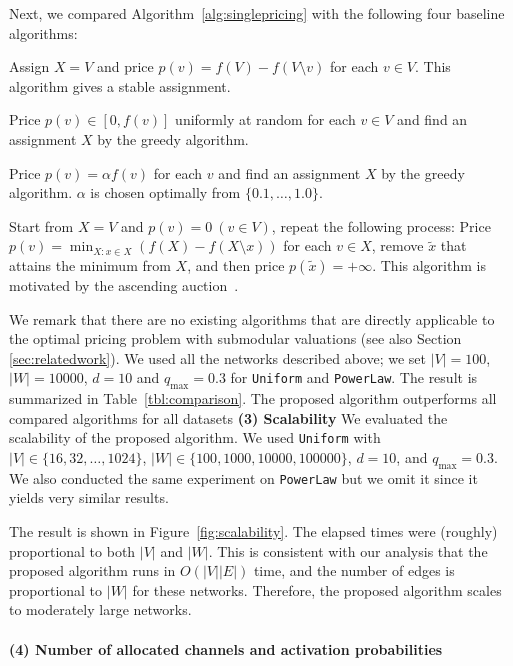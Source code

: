 \documentclass[letterpaper]{article}
\theoremstyle{definition}
\begin{document}
Next, we compared Algorithm~\ref{alg:singlepricing} with the following four baseline algorithms:
\begin{description} %
\setlength{\parskip}{0pt}
\setlength{\itemsep}{0pt}
\item[Selling all items.] Assign $X = V$ and price $p(v) = f(V) - f(V \setminus v)$ for each $v \in V$. This algorithm gives a stable assignment.
\item[Random pricing.] Price $p(v) \in [0, f(v)]$ uniformly at random for each $v \in V$ and find an assignment $X$ by the greedy algorithm.
\item[Scaled pricing.] Price $p(v) = \alpha f(v)$ for each $v$ and find an assignment $X$ by the greedy algorithm. $\alpha$ is chosen optimally from $\{0.1, \ldots, 1.0\}$.
\item[Ascending pricing.] Start from $X = V$ and $p(v) = 0 \ (v \in V)$, repeat the following process: Price $p(v) = \min_{X: x \in X}(f(X) - f(X \setminus x))$ for each $v \in X$, remove $\tilde x$ that attains the minimum from $X$, and then price $p(\tilde x) = +\infty$. This algorithm is motivated by the ascending auction~\cite{krishna2009auction}.
\end{description}
We remark that there are no existing algorithms that are directly applicable to the optimal pricing problem with submodular valuations (see also Section \ref{sec:relatedwork}).  We used all the networks described above; we set $|V| = 100$, $|W| = 10000$, $d = 10$ and $q_{\text{max}} = 0.3$ for \texttt{Uniform} and \texttt{PowerLaw}.
The result is summarized in Table~\ref{tbl:comparison}.
The proposed algorithm outperforms all compared algorithms for all datasets  \textbf{(3) Scalability} 
We evaluated the scalability of the proposed algorithm.
We used \texttt{Uniform} with $|V| \in \{16, 32, \ldots, 1024\}$, $|W| \in \{100, 1000, 10000, 100000\}$, $d = 10$, and $q_{\text{max}} = 0.3$.
We also conducted the same experiment on \texttt{PowerLaw} but we omit it since it yields very similar results.

The result is shown in Figure~\ref{fig:scalability}.
The elapsed times were (roughly) proportional to both $|V|$ and $|W|$.
This is consistent with our analysis that the proposed algorithm runs in $O(|V| |E|)$ time, and the number of edges is proportional to $|W|$ for these networks.
Therefore, the proposed algorithm scales to moderately large networks.

\paragraph{(4) Number of allocated channels and activation probabilities}
\end{document}
